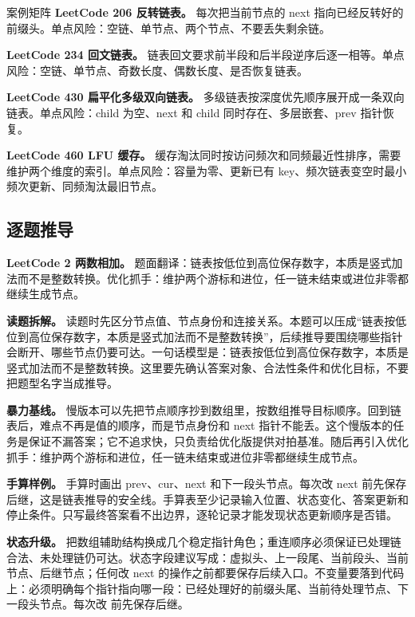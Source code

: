 \begin{principlebox}{案例矩阵}
\textbf{LeetCode 206 反转链表。}
每次把当前节点的 next 指向已经反转好的前缀头。单点风险：空链、单节点、两个节点、不要丢失剩余链。

\textbf{LeetCode 234 回文链表。}
链表回文要求前半段和后半段逆序后逐一相等。单点风险：空链、单节点、奇数长度、偶数长度、是否恢复链表。

\textbf{LeetCode 430 扁平化多级双向链表。}
多级链表按深度优先顺序展开成一条双向链表。单点风险：child 为空、next 和 child 同时存在、多层嵌套、prev 指针恢复。

\textbf{LeetCode 460 LFU 缓存。}
缓存淘汰同时按访问频次和同频最近性排序，需要维护两个维度的索引。单点风险：容量为零、更新已有 key、频次链表变空时最小频次更新、同频淘汰最旧节点。

\end{principlebox}

\subsection{逐题推导}

\noindent\textbf{LeetCode 2 两数相加。} 题面翻译：链表按低位到高位保存数字，本质是竖式加法而不是整数转换。优化抓手：维护两个游标和进位，任一链未结束或进位非零都继续生成节点。

\textbf{读题拆解。} 读题时先区分节点值、节点身份和连接关系。本题可以压成“链表按低位到高位保存数字，本质是竖式加法而不是整数转换”，后续推导要围绕哪些指针会断开、哪些节点仍要可达。一句话模型是：链表按低位到高位保存数字，本质是竖式加法而不是整数转换。这里要先确认答案对象、合法性条件和优化目标，不要把题型名字当成推导。

\textbf{暴力基线。} 慢版本可以先把节点顺序抄到数组里，按数组推导目标顺序。回到链表后，难点不再是值的顺序，而是节点身份和 next 指针不能丢。这个慢版本的任务是保证不漏答案；它不追求快，只负责给优化版提供对拍基准。随后再引入优化抓手：维护两个游标和进位，任一链未结束或进位非零都继续生成节点。

\textbf{手算样例。} 手算时画出 prev、cur、next 和下一段头节点。每次改 next 前先保存后继，这是链表推导的安全线。手算表至少记录输入位置、状态变化、答案更新和停止条件。只写最终答案看不出边界，逐轮记录才能发现状态更新顺序是否错。

\textbf{状态升级。} 把数组辅助结构换成几个稳定指针角色；重连顺序必须保证已处理链合法、未处理链仍可达。状态字段建议写成：虚拟头、上一段尾、当前段头、当前节点、后继节点；任何改 next 的操作之前都要保存后续入口。不变量要落到代码上：必须明确每个指针指向哪一段：已经处理好的前缀头尾、当前待处理节点、下一段头节点。每次改  前先保存后继。

